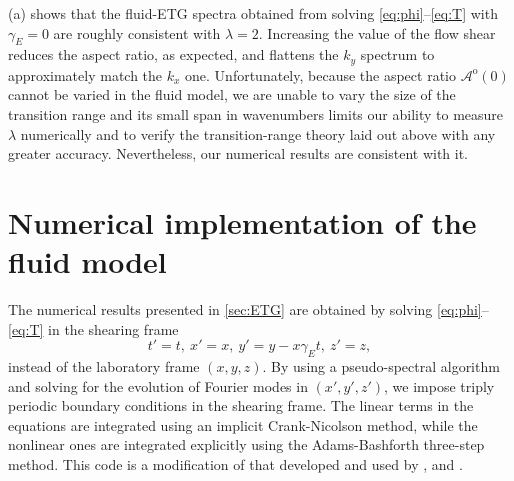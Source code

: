 \documentclass{jpp}
\newcommand{\gammaE}{\gamma_{E}}
\newcommand{\A}{\mathcal{A}}
\newcommand{\AoO}{\A^\text{o}(0)}
\begin{document}
(a) shows that the fluid-ETG spectra obtained from solving \cref{eq:phi}--\cref{eq:T} with \(\gammaE = 0\) are roughly consistent with \(\lambda = 2\). Increasing the value of the flow shear reduces the aspect ratio, as expected, and flattens the \(k_y\) spectrum to approximately match the \(k_x\) one. Unfortunately, because the aspect ratio \(\AoO\) cannot be varied in the fluid model, we are unable to vary the size of the transition range and its small span in wavenumbers limits our ability to measure \(\lambda\) numerically and to verify the transition-range theory laid out above with any greater accuracy. Nevertheless, our numerical results are consistent with it.


\section{Numerical implementation of the fluid model}
\label{appendix:fluid_numerics}

The numerical results presented in \cref{sec:ETG} are obtained by solving \cref{eq:phi}--\cref{eq:T} in the shearing frame
\begin{equation}
	t' = t, \ x' = x, \ y' = y - x\gammaE t, \ z' = z,
	\label{eq:appendix_shearing_frame}
\end{equation}
instead of the laboratory frame \((x, y, z)\). By using a pseudo-spectral algorithm and solving for the evolution of Fourier modes in \((x', y', z')\), we impose triply periodic boundary conditions in the shearing frame. The linear terms in the equations are integrated using an implicit Crank-Nicolson method, while the nonlinear ones are integrated explicitly using the Adams-Bashforth three-step method. This code is a modification of that developed and used by \citet{ivanov20}, \citet{ivanov22} and \citet{adkins23}.
\end{document}
